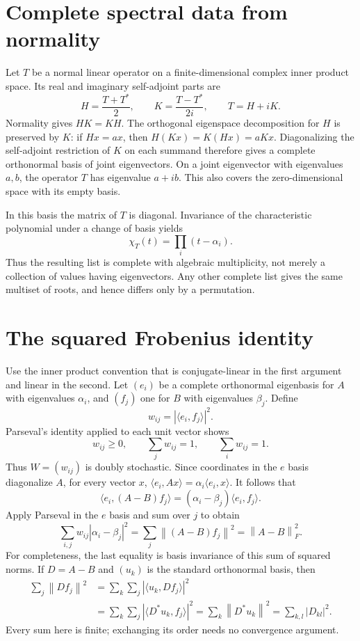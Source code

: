 \documentclass[11pt]{article}
\newcommand{\norm}[1]{\left\lVert#1\right\rVert}
\begin{document}
\section{Complete spectral data from normality}
Let $T$ be a normal linear operator on a finite-dimensional complex inner
product space. Its real and imaginary self-adjoint parts are
\[
 H=\frac{T+T^*}{2},\qquad K=\frac{T-T^*}{2i},\qquad T=H+iK.
\]
Normality gives $HK=KH$. The orthogonal eigenspace decomposition for $H$
is preserved by $K$: if $Hx=ax$, then $H(Kx)=K(Hx)=aKx$.
Diagonalizing the self-adjoint restriction of $K$ on each summand therefore
gives a complete orthonormal basis of joint eigenvectors. On a joint
eigenvector with eigenvalues $a,b$, the operator $T$ has eigenvalue $a+ib$.
This also covers the zero-dimensional space with its empty basis.

In this basis the matrix of $T$ is diagonal. Invariance of the characteristic
polynomial under a change of basis yields
\[
 \chi_T(t)=\prod_i(t-\alpha_i).
\]
Thus the resulting list is complete with algebraic multiplicity, not merely
a collection of values having eigenvectors. Any other complete list gives
the same multiset of roots, and hence differs only by a permutation.

\section{The squared Frobenius identity}
Use the inner product convention that is conjugate-linear in the first
argument and linear in the second. Let $(e_i)$ be a complete orthonormal
eigenbasis for $A$ with eigenvalues $\alpha_i$, and $(f_j)$ one for $B$ with
eigenvalues $\beta_j$. Define
\[
 w_{ij}=|\langle e_i,f_j\rangle|^2.
\]
Parseval's identity applied to each unit vector shows
\[
 w_{ij}\geq0,\qquad \sum_jw_{ij}=1,\qquad \sum_iw_{ij}=1.
\]
Thus $W=(w_{ij})$ is doubly stochastic. Since coordinates in the $e$ basis
diagonalize $A$, for every vector $x$,
$\langle e_i,Ax\rangle=\alpha_i\langle e_i,x\rangle$.
It follows that
\[
 \langle e_i,(A-B)f_j\rangle
 =(\alpha_i-\beta_j)\langle e_i,f_j\rangle.
\]
Apply Parseval in the $e$ basis and sum over $j$ to obtain
\begin{equation}\label{eq:weighted}
 \sum_{i,j}w_{ij}|\alpha_i-\beta_j|^2
 =\sum_j\norm{(A-B)f_j}^2
 =\norm{A-B}_F^2.
\end{equation}
For completeness, the last equality is basis invariance of this sum of
squared norms. If $D=A-B$ and $(u_k)$ is the standard orthonormal basis, then
\[
 \begin{aligned}
 \sum_j\norm{Df_j}^2
 &=\sum_k\sum_j|\langle u_k,Df_j\rangle|^2\\
 &=\sum_k\sum_j|\langle D^*u_k,f_j\rangle|^2
 =\sum_k\norm{D^*u_k}^2
 =\sum_{k,l}|D_{kl}|^2.
 \end{aligned}
\]
Every sum here is finite; exchanging its order needs no convergence argument.
\end{document}
